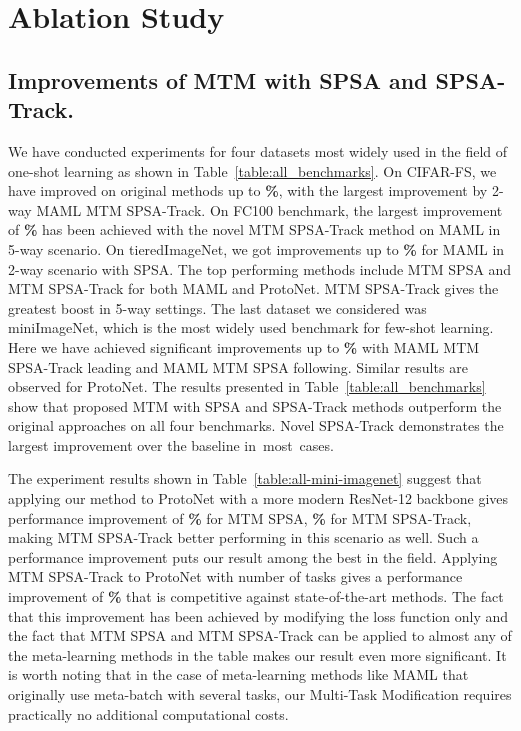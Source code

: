 \documentclass{article}
\begin{document}
\section{Ablation Study}

\subsection{Improvements of MTM with SPSA and SPSA-Track.} 

We have conducted experiments for four datasets most widely used in the field of one-shot learning as shown in Table~\ref{table:all_benchmarks}. On CIFAR-FS, we have improved on original methods up to {\bf \%}, with the largest improvement by 2-way MAML MTM SPSA-Track. On FC100 benchmark, the largest improvement of {\bf \%} has been achieved with the novel MTM SPSA-Track method on MAML in 5-way scenario. On tieredImageNet, we got improvements up to {\bf \%} for MAML in 2-way scenario with SPSA. The top performing methods include MTM SPSA and MTM SPSA-Track for both MAML and ProtoNet. MTM SPSA-Track gives the greatest boost in 5-way settings. The last dataset we considered was miniImageNet, which is the most widely used benchmark for few-shot learning. Here we have achieved significant improvements up to {\bf \%} with MAML MTM SPSA-Track leading and MAML MTM SPSA following. Similar results are observed for ProtoNet. The results presented in Table~\ref{table:all_benchmarks} show that proposed MTM with SPSA and SPSA-Track methods outperform the original approaches on all four benchmarks. Novel SPSA-Track demonstrates the largest improvement over the baseline in~most~cases.

The experiment results shown in Table~\ref{table:all-mini-imagenet} suggest that applying our method to ProtoNet with a more modern ResNet-12 backbone gives performance improvement of {\bf \%} for MTM SPSA, {\bf \%} for MTM SPSA-Track, making MTM SPSA-Track better performing in this scenario as well. Such a performance improvement puts our result among the best in the field. Applying MTM SPSA-Track to ProtoNet with number of tasks  gives a performance improvement of {\bf \%} that is competitive against state-of-the-art methods. The fact that this improvement has been achieved by modifying the loss function only and the fact that MTM SPSA and MTM SPSA-Track can be applied to almost any of the meta-learning methods in the table makes our result even more significant. It is worth noting that in the case of meta-learning methods like MAML that originally use meta-batch with several tasks, our Multi-Task Modification requires practically no additional computational costs.
\end{document}
